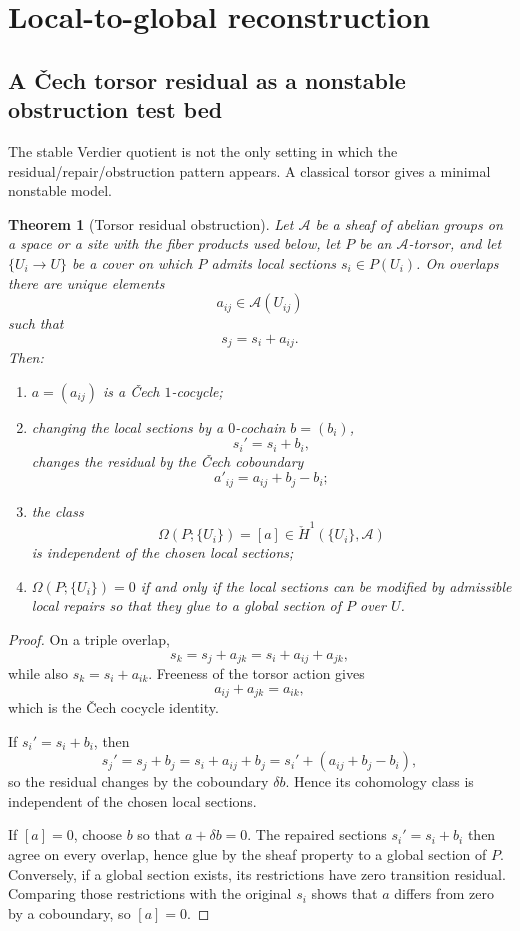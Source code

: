 \documentclass[11pt]{article}
\newtheorem{theorem}{Theorem}[section]
\theoremstyle{definition}
\theoremstyle{remark}
\begin{document}
\section{Local-to-global reconstruction}

\subsection{A \v{C}ech torsor residual as a nonstable obstruction test bed}

The stable Verdier quotient is not the only setting in which the residual/repair/obstruction pattern appears. A classical torsor gives a minimal nonstable model.

\begin{theorem}[Torsor residual obstruction]\label{thm:torsor-obstruction}
Let $\mathcal A$ be a sheaf of abelian groups on a space or a site with the fiber products used below, let $P$ be an $\mathcal A$-torsor, and let $\{U_i\to U\}$ be a cover on which $P$ admits local sections $s_i\in P(U_i)$. On overlaps there are unique elements
\[
a_{ij}\in\mathcal A(U_{ij})
\]
such that
\[
s_j=s_i+a_{ij}.
\]
Then:
\begin{enumerate}
    \item $a=(a_{ij})$ is a \v{C}ech $1$-cocycle;
    \item changing the local sections by a $0$-cochain $b=(b_i)$,
    \[
    s_i'=s_i+b_i,
    \]
    changes the residual by the \v{C}ech coboundary
    \[
    a'_{ij}=a_{ij}+b_j-b_i;
    \]
    \item the class
    \[
    \Omega(P;\{U_i\})=[a]\in\check H^1(\{U_i\},\mathcal A)
    \]
    is independent of the chosen local sections;
    \item $\Omega(P;\{U_i\})=0$ if and only if the local sections can be modified by admissible local repairs so that they glue to a global section of $P$ over $U$.
\end{enumerate}
\end{theorem}

\begin{proof}
On a triple overlap,
\[
s_k=s_j+a_{jk}=s_i+a_{ij}+a_{jk},
\]
while also $s_k=s_i+a_{ik}$. Freeness of the torsor action gives
\[
a_{ij}+a_{jk}=a_{ik},
\]
which is the \v{C}ech cocycle identity.

If $s_i'=s_i+b_i$, then
\[
s_j'=s_j+b_j=s_i+a_{ij}+b_j
=s_i'+(a_{ij}+b_j-b_i),
\]
so the residual changes by the coboundary $\delta b$. Hence its cohomology class is independent of the chosen local sections.

If $[a]=0$, choose $b$ so that $a+\delta b=0$. The repaired sections $s_i'=s_i+b_i$ then agree on every overlap, hence glue by the sheaf property to a global section of $P$. Conversely, if a global section exists, its restrictions have zero transition residual. Comparing those restrictions with the original $s_i$ shows that $a$ differs from zero by a coboundary, so $[a]=0$.
\end{proof}
\end{document}
